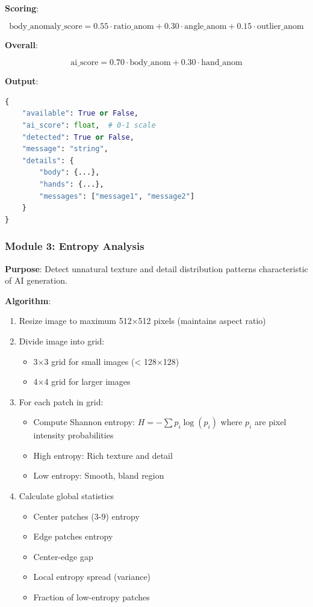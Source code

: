 \documentclass[12pt,a4paper]{book}
\begin{document}
\textbf{Scoring}:

\begin{equation}
\text{body\_anomaly\_score} = 0.55 \cdot \text{ratio\_anom} + 0.30 \cdot \text{angle\_anom} + 0.15 \cdot \text{outlier\_anom}
\end{equation}

\textbf{Overall}:

\begin{equation}
\text{ai\_score} = 0.70 \cdot \text{body\_anom} + 0.30 \cdot \text{hand\_anom}
\end{equation}

\textbf{Output}:
\begin{lstlisting}[language=Python]
{
    "available": True or False,
    "ai_score": float,  # 0-1 scale
    "detected": True or False,
    "message": "string",
    "details": {
        "body": {...},
        "hands": {...},
        "messages": ["message1", "message2"]
    }
}
\end{lstlisting}

\subsubsection{Module 3: Entropy Analysis}

\textbf{Purpose}: Detect unnatural texture and detail distribution patterns characteristic of AI generation.

\textbf{Algorithm}:

\begin{enumerate}
    \item Resize image to maximum 512×512 pixels (maintains aspect ratio)
    \item Divide image into grid:
    \begin{itemize}
        \item 3×3 grid for small images (< 128×128)
        \item 4×4 grid for larger images
    \end{itemize}
    \item For each patch in grid:
    \begin{itemize}
        \item Compute Shannon entropy: $H = -\sum p_i \log(p_i)$ where $p_i$ are pixel intensity probabilities
        \item High entropy: Rich texture and detail
        \item Low entropy: Smooth, bland region
    \end{itemize}
    \item Calculate global statistics
    \begin{itemize}
        \item Center patches (3-9) entropy
        \item Edge patches entropy
        \item Center-edge gap
        \item Local entropy spread (variance)
        \item Fraction of low-entropy patches
    \end{itemize}
\end{enumerate}
\end{document}
